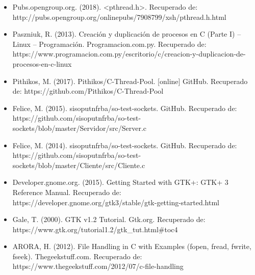 \documentclass{article}
\begin{document}
\begin{itemize}

    \item Pubs.opengroup.org. (2018). <pthread.h>. Recuperado de: http://pubs.opengroup.org/onlinepubs/7908799/xsh/pthread.h.html 
    
    \item Paszniuk, R. (2013). Creación y duplicación de procesos en C (Parte I) – Linux – Programación. Programacion.com.py. Recuperado de: https://www.programacion.com.py/escritorio/c/creacion-y-duplicacion-de-procesos-en-c-linux
    
    \item Pithikos, M. (2017). Pithikos/C-Thread-Pool. [online] GitHub. Recuperado de: https://github.com/Pithikos/C-Thread-Pool 
    \item Felice, M. (2015). sisoputnfrba/so-test-sockets. GitHub. Recuperado de: https://github.com/sisoputnfrba/so-test-sockets/blob/master/Servidor/src/Server.c 
    
    \item Felice, M. (2014). sisoputnfrba/so-test-sockets. GitHub. Recuperado de: https://github.com/sisoputnfrba/so-test-sockets/blob/master/Cliente/src/Cliente.c 
    
    \item Developer.gnome.org. (2015). Getting Started with GTK+: GTK+ 3 Reference Manual. Recuperado de:
    https://developer.gnome.org/gtk3/stable/gtk-getting-started.html 
    
    \item Gale, T. (2000). GTK v1.2 Tutorial. Gtk.org. Recuperado de: https://www.gtk.org/tutorial1.2/gtk_tut.html#toc4 
    
    \item  ARORA, H. (2012). File Handling in C with Examples (fopen, fread, fwrite, fseek). Thegeekstuff.com. Recuperado de: https://www.thegeekstuff.com/2012/07/c-file-handling
    
\end{itemize}
\end{document}
